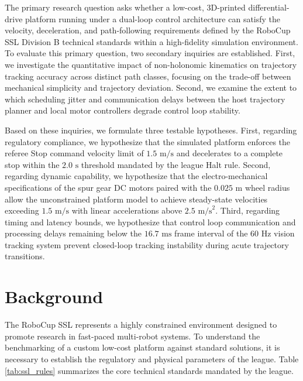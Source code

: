 \documentclass[a4paper,twoside,12pt]{report}
\begin{document}
The primary research question asks whether a low-cost, 3D-printed differential-drive platform running under a dual-loop control architecture can satisfy the velocity, deceleration, and path-following requirements defined by the RoboCup SSL Division B technical standards within a high-fidelity simulation environment. To evaluate this primary question, two secondary inquiries are established. First, we investigate the quantitative impact of non-holonomic kinematics on trajectory tracking accuracy across distinct path classes, focusing on the trade-off between mechanical simplicity and trajectory deviation. Second, we examine the extent to which scheduling jitter and communication delays between the host trajectory planner and local motor controllers degrade control loop stability.

Based on these inquiries, we formulate three testable hypotheses. First, regarding regulatory compliance, we hypothesize that the simulated platform enforces the referee Stop command velocity limit of $1.5\text{ m/s}$ and decelerates to a complete stop within the $2.0\text{ s}$ threshold mandated by the league Halt rule. Second, regarding dynamic capability, we hypothesize that the electro-mechanical specifications of the spur gear DC motors paired with the $0.025\text{ m}$ wheel radius allow the unconstrained platform model to achieve steady-state velocities exceeding $1.5\text{ m/s}$ with linear accelerations above $2.5\text{ m/s}^2$. Third, regarding timing and latency bounds, we hypothesize that control loop communication and processing delays remaining below the $16.7\text{ ms}$ frame interval of the $60\text{ Hz}$ vision tracking system prevent closed-loop tracking instability during acute trajectory transitions.

\chapter{Background}\label{chapter: background}

The RoboCup SSL represents a highly constrained environment designed to promote research in fast-paced multi-robot systems. To understand the benchmarking of a custom low-cost platform against standard solutions, it is necessary to establish the regulatory and physical parameters of the league. Table \ref{tab:ssl_rules} summarizes the core technical standards mandated by the league.
\end{document}
